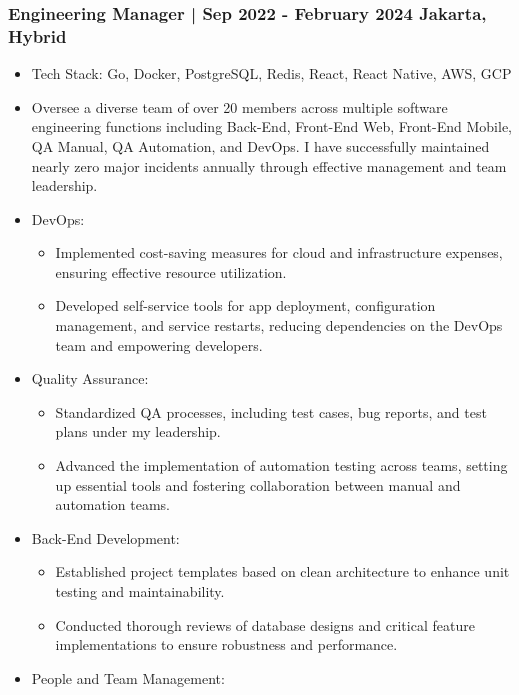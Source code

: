 \documentclass[11pt]{article}
\begin{document}
\subsubsection{Engineering Manager | Sep 2022 - February 2024 \hfill Jakarta, Hybrid}
\begin{itemize}
    \item Tech Stack: Go, Docker, PostgreSQL, Redis, React, React Native, AWS, GCP
    \item Oversee a diverse team of over 20 members across multiple software engineering functions including Back-End, Front-End Web, Front-End Mobile, QA Manual, QA Automation, and DevOps. I have successfully maintained nearly zero major incidents annually through effective management and team leadership.
    \item DevOps:
          \begin{itemize}
              \item Implemented cost-saving measures for cloud and infrastructure expenses, ensuring effective resource utilization.
              \item Developed self-service tools for app deployment, configuration management, and service restarts, reducing dependencies on the DevOps team and empowering developers.
          \end{itemize}
    \item Quality Assurance:
          \begin{itemize}
              \item Standardized QA processes, including test cases, bug reports, and test plans under my leadership.
              \item Advanced the implementation of automation testing across teams, setting up essential tools and fostering collaboration between manual and automation teams.
          \end{itemize}
    \item Back-End Development:
          \begin{itemize}
              \item Established project templates based on clean architecture to enhance unit testing and maintainability.
              \item Conducted thorough reviews of database designs and critical feature implementations to ensure robustness and performance.
          \end{itemize}
    \item People and Team Management:
          \begin{itemize}

\end{itemize}
\end{itemize}
\end{document}
